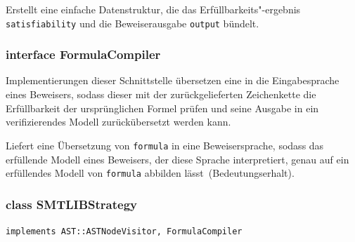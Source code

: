 \begin{description}%

    Erstellt eine einfache Datenstruktur, die das
    Erfüllbarkeits"-ergebnis \texttt{satisfiability} und die
    Beweiserausgabe \texttt{output} bündelt.%

\end{description}%

\subsubsection{interface FormulaCompiler}%

Implementierungen dieser Schnittstelle übersetzen eine
 in die Eingabesprache eines Beweisers, sodass dieser
mit der zurückgelieferten Zeichenkette die Erfüllbarkeit der
ursprünglichen Formel prüfen und seine Ausgabe in ein verifizierendes
Modell zurückübersetzt werden kann.%


\begin{description}%

    Liefert eine Übersetzung von \texttt{formula} in eine
    Beweisersprache, sodass das erfüllende Modell eines Beweisers, der
    diese Sprache interpretiert, genau auf ein erfüllendes Modell von
    \texttt{formula} abbilden lässt~(Bedeutungserhalt).%


\end{description}%

\subsubsection{class SMTLIBStrategy}%

\texttt{implements AST::ASTNodeVisitor, FormulaCompiler}%


\begin{description}%

\end{description}%


%

